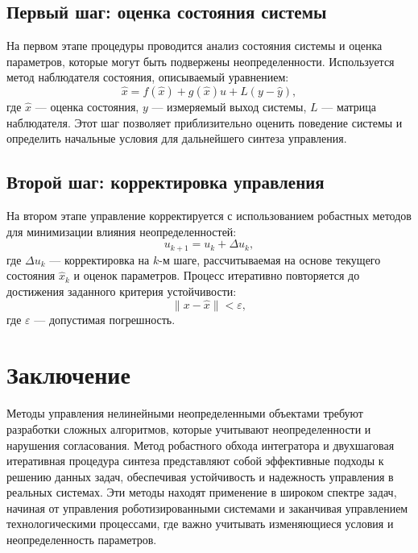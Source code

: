 \documentclass[a4paper,14pt]{extarticle} %
\begin{document}
\subsection{Первый шаг: оценка состояния системы}
На первом этапе процедуры проводится анализ состояния системы и оценка параметров, которые могут быть подвержены неопределенности. Используется метод наблюдателя состояния, описываемый уравнением:
\begin{equation}
    \hat{x} = f(\hat{x}) + g(\hat{x})u + L(y - \hat{y}),
\end{equation}
где \(\hat{x}\) — оценка состояния, \(y\) — измеряемый выход системы, \(L\) — матрица наблюдателя. Этот шаг позволяет приблизительно оценить поведение системы и определить начальные условия для дальнейшего синтеза управления.

\subsection{Второй шаг: корректировка управления}
На втором этапе управление корректируется с использованием робастных методов для минимизации влияния неопределенностей:
\begin{equation}
    u_{k+1} = u_k + \Delta u_k,
\end{equation}
где \(\Delta u_k\) — корректировка на \(k\)-м шаге, рассчитываемая на основе текущего состояния \(\hat{x}_k\) и оценок параметров. Процесс итеративно повторяется до достижения заданного критерия устойчивости:
\begin{equation}
    \|x - \hat{x}\| < \varepsilon,
\end{equation}
где \(\varepsilon\) — допустимая погрешность.

\newpage
\section{Заключение}
Методы управления нелинейными неопределенными объектами требуют разработки сложных алгоритмов, которые учитывают неопределенности и нарушения согласования. Метод робастного обхода интегратора и двухшаговая итеративная процедура синтеза представляют собой эффективные подходы к решению данных задач, обеспечивая устойчивость и надежность управления в реальных системах. Эти методы находят применение в широком спектре задач, начиная от управления роботизированными системами и заканчивая управлением технологическими процессами, где важно учитывать изменяющиеся условия и неопределенность параметров.
\end{document}
